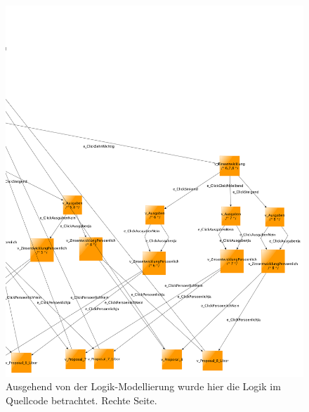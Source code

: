 \begin{figure}[p] 
\begin{fullpage}
\hspace*{-2cm}
\includegraphics[width=1.2\textwidth]{figures/modell_logisch_right.png}
\caption{Ausgehend von der Logik-Modellierung wurde hier die Logik im Quellcode betrachtet. Rechte Seite.}
\end{fullpage} \end{figure} 

